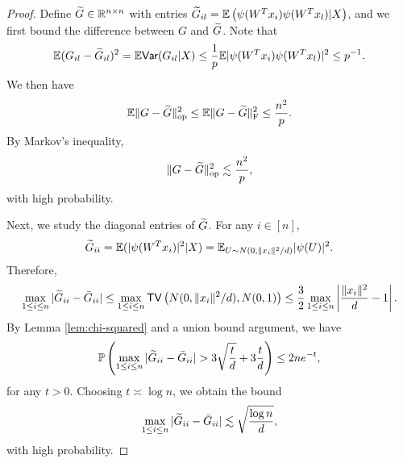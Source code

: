 \begin{proof}
Define $\widetilde{G}\in\mathbb{R}^{n\times n}$ with entries $\widetilde{G}_{il}=\mathbb{E}\left(\psi(W^Tx_i)\psi(W^Tx_l)|X\right)$, and we first bound the difference between $G$ and $\widetilde{G}$. Note that
$$\mathbb{E}(G_{il}-\widetilde{G}_{il})^2 = \mathbb{E}\textsf{Var}(G_{il}|X) \leq \frac{1}{p}\mathbb{E}|\psi(W^Tx_i)\psi(W^Tx_l)|^2 \leq p^{-1}.$$
We then have
$$
\mathbb{E}\|G-\widetilde{G}\|_{\rm op}^2 \leq \mathbb{E}\|G-\widetilde{G}\|_{\rm F}^2 \leq \frac{n^2}{p}.
$$
By Markov's inequality,
\begin{equation}
\opnorm{G-\wt{G}}^2 \lesssim \frac{n^2}{p}, \label{eq:G-G-tilde}
\end{equation}
with high probability.

Next, we study the diagonal entries of $\widetilde{G}$. For any $i\in[n]$, 
$$\widetilde{G}_{ii}=\mathbb{E}(|\psi(W^Tx_i)|^2|X)=\mathbb{E}_{U\sim N(0,\|x_i\|^2/d)}|\psi(U)|^2.$$
Therefore,
$$\max_{1\leq i\leq n}|\widetilde{G}_{ii}-\bar{G}_{ii}|\leq \max_{1\leq i\leq n}{\sf TV}\left(N(0,\|x_i\|^2/d), N(0,1)\right)\leq\frac{3}{2}\max_{1\leq i\leq n}\left|\frac{\|x_i\|^2}{d}-1\right|.$$
By Lemma \ref{lem:chi-squared} and a union bound argument, we have
$$\mathbb{P}\left(\max_{1\leq i\leq n}|\wt{G}_{ii}-\bar{G}_{ii}|>3\sqrt{\frac{t}{d}}+3\frac{t}{d}\right)\leq 2ne^{-t},$$
for any $t>0$. Choosing $t\asymp\log n$, we obtain the bound
\begin{equation}
\max_{1\leq i\leq n}|\wt{G}_{ii}-\bar{G}_{ii}|\lesssim \sqrt{\frac{\log n}{d}}, \label{eq:G-diag}
\end{equation}
with high probability.


\end{proof}
